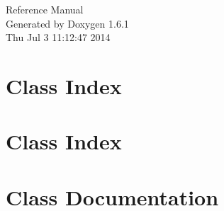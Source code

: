 \documentclass[a4paper]{book}
\begin{document}
\hypersetup{pageanchor=false}
\begin{titlepage}
\vspace*{7cm}
\begin{center}
{\Large Reference Manual}\\
\vspace*{1cm}
{\large Generated by Doxygen 1.6.1}\\
\vspace*{0.5cm}
{\small Thu Jul 3 11:12:47 2014}\\
\end{center}
\end{titlepage}
\clearemptydoublepage
{}
\tableofcontents
\clearemptydoublepage
{}
\hypersetup{pageanchor=true}
\chapter{Class Index}

\chapter{Class Index}

\chapter{Class Documentation}


























\printindex
\end{document}
